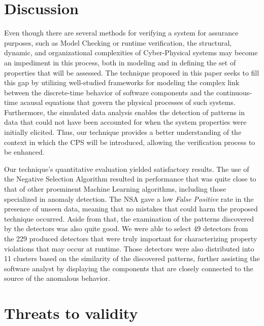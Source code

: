 \section{Discussion}

Even though there are several methods for verifying a system for assurance purposes, such as Model Checking or runtime verification, the structural, dynamic, and organizational complexities of Cyber-Physical systems may become an impediment in this process, both in modeling and in defining the set of properties that will be assessed. The technique proposed in this paper seeks to fill this gap by utilizing well-studied frameworks for modeling the complex link between the discrete-time behavior of software components and the continuous-time acausal equations that govern the physical processes of such systems. Furthermore, the simulated data analysis enables the detection of patterns in data that could not have been accounted for when the system properties were initially elicited. Thus, our technique provides a better understanding of the context in which the CPS will be introduced, allowing the verification process to be enhanced.

Our technique's quantitative evaluation yielded satisfactory results. The use of the Negative Selection Algorithm resulted in performance that was quite close to that of other proeminent Machine Learning algorithms, including those specialized in anomaly detection. The NSA gave a low \textit{False Positive} rate in the presence of unseen data, meaning that no mistakes that could harm the proposed technique occurred. Aside from that, the examination of the patterns discovered by the detectors was also quite good. We were able to select 49 detectors from the 229 produced detectors that were truly important for characterizing property violations that may occur at runtime. Those detectors were also distributed into 11 clusters based on the similarity of the discovered patterns, further assisting the software analyst by displaying the components that are closely connected to the source of the anomalous behavior.


\section{Threats to validity}

